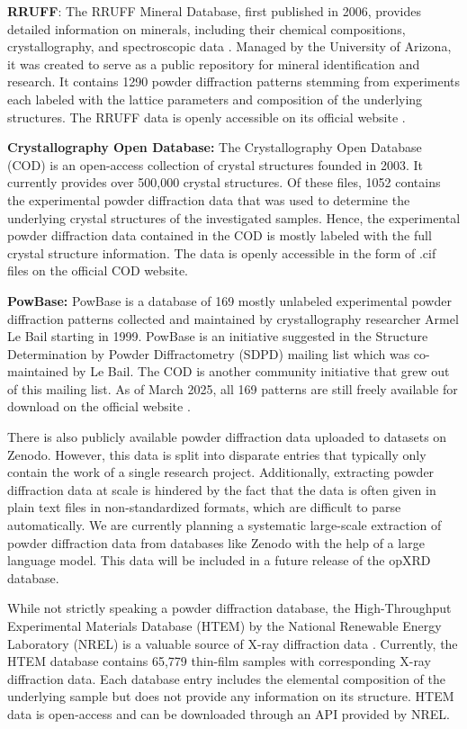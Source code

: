 \textbf{RRUFF}: \cite{RRUFFWeb} The RRUFF Mineral Database, first published in 2006, provides detailed information on minerals, including their chemical compositions, crystallography, and spectroscopic data \cite{lafuente2015}. Managed by the University of Arizona, it was created to serve as a public repository for mineral identification and research. It contains \num{1290} powder diffraction patterns stemming from experiments each labeled with the lattice parameters and composition of the underlying structures. The RRUFF data is openly accessible on its official website \cite{RRUFFWeb}.

\textbf{Crystallography Open Database:} \cite{CODWeb} The Crystallography Open Database (COD) is an open-access collection of crystal structures founded in 2003\cite{Graulis2009cod}. It currently provides over 500,000 crystal structures. Of these files, 1052 contains the experimental powder diffraction data that was used to determine the underlying crystal structures of the investigated samples. Hence, the experimental powder diffraction data contained in the COD is mostly labeled with the full crystal structure information. The data is openly accessible in the form of .cif files on the official COD website\cite{CODWeb}.

\textbf{PowBase:} \cite{PowBaseWeb} PowBase is a database of 169 mostly unlabeled experimental powder diffraction patterns collected and maintained by crystallography researcher Armel Le Bail starting in 1999. PowBase is an initiative suggested in the Structure Determination by Powder Diffractometry (SDPD) mailing list which was co-maintained by Le Bail. The COD is another community initiative that grew out of this mailing list. As of March 2025, all 169 patterns are still freely available for download on the official website \cite{PowBaseWeb}.

There is also publicly available powder diffraction data uploaded to datasets on Zenodo. However, this data is split into disparate entries that typically only contain the work of a single research project. Additionally, extracting powder diffraction data at scale is hindered by the fact that the data is often given in plain text files in non-standardized formats, which are difficult to parse automatically. We are currently planning a systematic large-scale extraction of powder diffraction data from databases like Zenodo with the help of a large language model. This data will be included in a future release of the opXRD database.

While not strictly speaking a powder diffraction database, the High-Throughput Experimental Materials Database (HTEM) by the National Renewable Energy Laboratory (NREL) is a valuable source of X-ray diffraction data \cite{zakutayev2018}. Currently, the HTEM database contains 65,779 thin-film samples with corresponding X-ray diffraction data\cite{HTEMWeb}. Each database entry includes the elemental composition of the underlying sample but does not provide any information on its structure. HTEM data is open-access and can be downloaded through an API provided by NREL.

